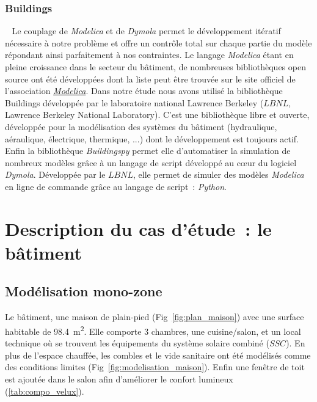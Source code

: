 \subsubsection{Buildings} %
\label{ssub:buildings}
~
Le couplage de \emph{Modelica} et de \emph{Dymola} permet le développement itératif
nécessaire à notre problème et offre un contrôle total sur chaque partie du modèle
répondant ainsi parfaitement à nos contraintes. Le langage \emph{Modelica} étant en pleine
croissance dans le secteur du bâtiment, de nombreuses bibliothèques open source ont été
développées dont la liste peut être trouvée sur le site officiel de l’association
\href{https://www.modelica.org/libraries}{\emph{Modelica}}. Dans notre étude nous avons
utilisé la bibliothèque Buildings développée par le laboratoire national Lawrence
Berkeley ($LBNL$, Lawrence Berkeley National Laboratory). C’est une bibliothèque libre et
ouverte, développée pour la modélisation des systèmes du bâtiment (hydraulique,
aéraulique, électrique, thermique, ...) dont le développement est toujours actif. Enfin la
bibliothèque \emph{Buildingspy} permet elle d’automatiser la simulation de
nombreux modèles grâce à un langage de script développé au cœur du logiciel \emph{Dymola}.
Développée par le $LBNL$, elle permet de simuler des modèles
\emph{Modelica} en ligne de commande grâce au langage de script~: \emph{Python}.




\section{Description du cas d’étude~: le bâtiment} %
\label{sec:description_du_cas_d_etude_le_batiment}
\subsection{Modélisation mono-zone} %
\label{sub:modelisation_monozone}
Le bâtiment, une maison de plain-pied (Fig~\ref{fig:plan_maison}) avec une surface habitable
de \SI{98.4}{\meter\squared}. Elle comporte 3 chambres, une cuisine/salon, et un local
technique où se trouvent les équipements du système solaire combiné ($SSC$). En plus de
l’espace chauffée, les combles et le vide sanitaire ont été modélisés comme des conditions
limites (Fig~\ref{fig:modelisation_maison}). Enfin une fenêtre de toit est ajoutée dans
le salon afin d’améliorer le confort lumineux (\autoref{tab:compo_velux}).

